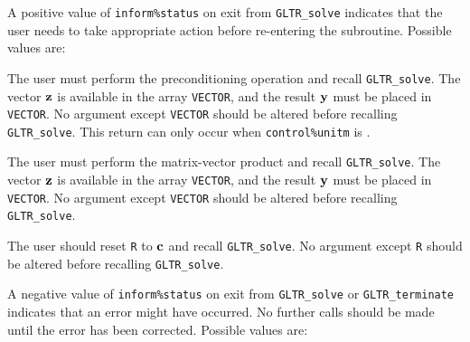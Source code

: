 \documentclass{galahad}
\newcommand{\packagename}{GL\-TR}
\begin{document}

\galreverse
A positive value of {\tt inform\%status} on exit from
{\tt \packagename\_solve} indicates that the user needs to take appropriate
action before re-entering the subroutine. Possible values are:

\begin{description}

 The user must perform the preconditioning operation
and recall {\tt \packagename\_solve}.
The vector ${\mathbf{z}}$ is available in the array {\tt VECTOR}, and the result
${\mathbf{y}}$ must be placed in {\tt VECTOR}.
No argument except {\tt VECTOR} should be altered before recalling
{\tt \packagename\_solve}. This return can only occur when
{\tt control\%unitm} is \false.

 The user must perform the matrix-vector product
\disp{\bmy := \bmH \bmz}
and recall {\tt \packagename\_solve}.
The vector ${\mathbf{z}}$ is available in the array {\tt VECTOR}, and the result
${\mathbf{y}}$ must be placed in {\tt VECTOR}.
No argument except {\tt VECTOR} should be altered before recalling
{\tt \packagename\_solve}.

 The user should reset {\tt R} to ${\mathbf{c}}$ and recall
{\tt \packagename\_solve}.
No argument except {\tt R} should be altered before recalling
{\tt \packagename\_solve}.
\end{description}


\galerrors
A negative value of  {\tt inform\%status} on exit from
{\tt \packagename\_solve}
or
{\tt \packagename\_terminate}
indicates that an error might have occurred. No further calls should be made
until the error has been corrected. Possible values are:
\end{document}
